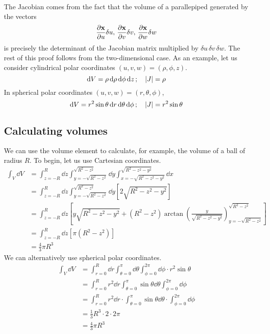 The Jacobian comes from the fact that the volume of a parallepiped generated by the vectors
\[
	\frac{\partial \vb x}{\partial u} \delta u,\,\frac{\partial \vb x}{\partial v} \delta v,\,\frac{\partial \vb x}{\partial w} \delta w
\]
is precisely the determinant of the Jacobian matrix multiplied by \(\delta u\,\delta v\,\delta w\).
The rest of this proof follows from the two-dimensional case.
As an example, let us consider cylindrical polar coordinates \((u, v, w) = (\rho, \phi, z)\).
\[
	\dd{V} = \rho \dd{\rho} \dd{\phi} \dd{z};\quad \abs{J} = \rho
\]
In spherical polar coordinates \((u, v, w) = (r, \theta, \phi)\),
\[
	\dd{V} = r^2 \sin\theta \dd{r} \dd{\theta} \dd{\phi};\quad \abs{J} = r^2\sin\theta
\]

\subsection{Calculating volumes}
We can use the volume element to calculate, for example, the volume of a ball of radius \(R\).
To begin, let us use Cartesian coordinates.
\begin{align*}
	\int_V \dd{V} & = \int_{z=-R}^R \dd{z} \int_{y = -\sqrt{R^2 - z^2}}^{\sqrt{R^2 - z^2}} \dd{y} \int_{x = -\sqrt{R^2 - z^2 - y^2}}^{\sqrt{R^2 - z^2 - y^2}} \dd{x}                             \\
	              & = \int_{z=-R}^R \dd{z} \int_{y = -\sqrt{R^2 - z^2}}^{\sqrt{R^2 - z^2}} \dd{y} \left[ 2\sqrt{R^2 - z^2 - y^2} \right]                                                         \\
	              & = \int_{z=-R}^R \dd{z} \left[ y\sqrt{R^2 - z^2 - y^2} + (R^2 - z^2) \arctan \left( \frac{y}{\sqrt{R^2 - z^2 - y^2}} \right)_{y=-\sqrt{R^2 - z^2}}^{\sqrt{R^2 - z^2}} \right] \\
	              & = \int_{z=-R}^R \dd{z} \left[ \pi (R^2 - z^2) \right]                                                                                                                        \\
	              & = \frac{4}{3}\pi R^3
\end{align*}
We can alternatively use spherical polar coordinates.
\begin{align*}
	\int_V \dd{V} & = \int_{r=0}^R \dd{r} \int_{\theta=0}^\pi \dd{\theta} \int_{\phi=0}^{2\pi} \dd{\phi} \cdot r^2 \sin\theta     \\
	              & = \int_{r=0}^R r^2\dd{r} \int_{\theta=0}^\pi \sin\theta\dd{\theta} \int_{\phi=0}^{2\pi} \dd{\phi}             \\
	              & = \int_{r=0}^R r^2\dd{r} \cdot \int_{\theta=0}^\pi \sin\theta\dd{\theta} \cdot \int_{\phi=0}^{2\pi} \dd{\phi} \\
	              & = \frac{1}{3}R^3 \cdot 2 \cdot 2 \pi                                                                          \\
	              & = \frac{4}{3}\pi R^3
\end{align*}
